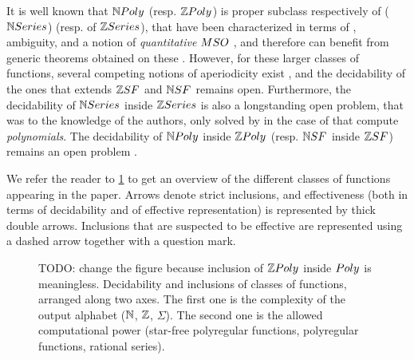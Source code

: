 It is well known that $\NPoly$ (resp. $\ZPoly$) is proper subclass respectively
of  ($\NRat$) (resp. of 
$\ZRat$), that have been characterized in terms of , ambiguity,
and a notion of \emph{quantitative} $\MSO$
\cite{schutzenberger1962,kreutzer2013}, and therefore can benefit from generic
theorems obtained on these \cite{berstel2011noncommutative}. However, for these
larger classes of functions, several competing notions of aperiodicity exist
\cite{droste2019aperiodic,reutenauer_series_1980,LOPEZ23b}, and the
decidability of the ones that extends $\ZSF$ and $\NSF$ remains open.
Furthermore, the decidability of $\NRat$ inside $\ZRat$ is also a longstanding
open problem, that was to the knowledge of the authors, only solved by
\textcite{KARH77} in the case of  that compute
\emph{polynomials}. The decidability of $\NPoly$ inside $\ZPoly$ (resp. $\NSF$
inside $\ZSF$) remains an open problem
\cite[see e.g.][Open question 5.55]{gaetanphd}.


We refer the reader to \cref{previously-known-inclusions:fig} to get an
overview of the different classes of functions appearing in the paper. Arrows
denote strict inclusions, and effectiveness (both in terms of decidability and
of effective representation) is represented by thick double arrows. Inclusions
that are suspected to be effective are represented using a dashed arrow
together with a question mark.


\begin{figure}
    
    \caption{
        TODO: change the figure because inclusion of $\ZPoly$
        inside $\Poly$ is meaningless.
        Decidability and inclusions of classes of functions,
        arranged along two axes. The first one is the complexity
        of the output alphabet ($\mathbb{N}$, $\mathbb{Z}$, $\Sigma$). The second
        one is the allowed computational power
        (star-free polyregular functions, polyregular functions, 
        rational series).
    }
    \label{previously-known-inclusions:fig}
\end{figure}


